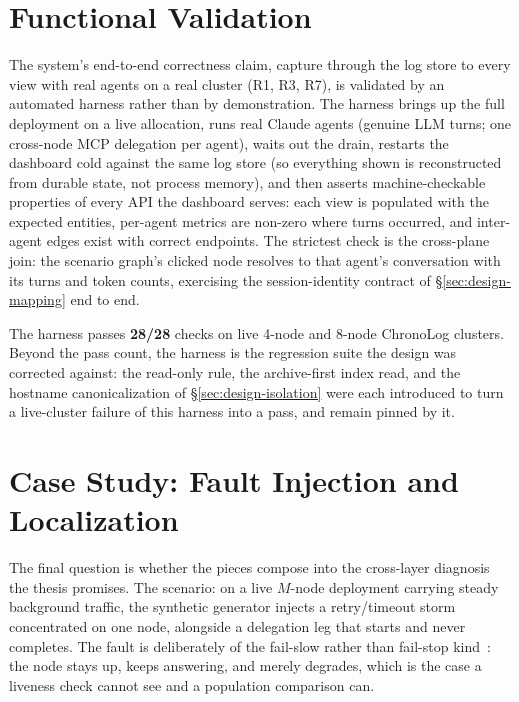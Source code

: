 \section{Functional Validation}
\label{sec:eval-functional}

The system's end-to-end correctness claim, capture through the log store to
every view with real agents on a real cluster (R1, R3, R7), is
validated by an automated harness rather than by demonstration. The
harness brings up the full deployment on a live allocation, runs real
Claude agents (genuine LLM turns; one cross-node MCP delegation
per agent), waits out the drain, restarts the dashboard cold against the
same log store (so everything shown is reconstructed from durable state,
not process memory), and then asserts machine-checkable properties of
every API the dashboard serves: each view is populated with the expected
entities, per-agent metrics are non-zero where turns occurred, and
inter-agent edges exist with correct endpoints. The strictest check is
the cross-plane join: the scenario graph's clicked node resolves to that
agent's conversation with its turns and token counts, exercising the
session-identity contract of \S\ref{sec:design-mapping} end to end.

The harness passes \textbf{28/28} checks on live 4-node and 8-node
ChronoLog clusters. Beyond the pass count, the harness is the regression
suite the design was corrected against: the read-only rule, the archive-first
index read, and the hostname canonicalization of
\S\ref{sec:design-isolation} were each introduced to turn a live-cluster
failure of this harness into a pass, and remain pinned by it.

\section{Case Study: Fault Injection and Localization}
\label{sec:eval-casestudy}

The final question is whether the pieces compose into the cross-layer
diagnosis the thesis promises. The scenario: on a live $M$-node
deployment carrying steady background traffic, the synthetic generator
injects a retry/timeout storm concentrated on one node, alongside a
delegation leg that starts and never completes. The fault is deliberately
of the fail-slow rather than fail-stop kind~\cite{gunawi2018failslow}: the
node stays up, keeps answering, and merely degrades, which is the case a
liveness check cannot see and a population comparison can.

